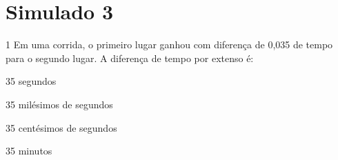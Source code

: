 






\mbox{}



\pagebreak

\section*{Simulado 3}

\num{1} Em uma corrida, o primeiro lugar ganhou com diferença de 0,035 de
tempo para o segundo lugar. A diferença de tempo por extenso é:

\begin{escolha}
\item 35 segundos
\item 35 milésimos de segundos
\item 35 centésimos de segundos
\item 35 minutos
\end{escolha}


